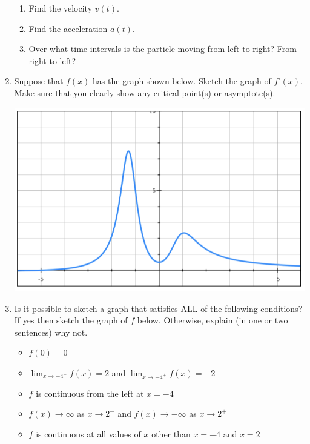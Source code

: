 \documentclass[letterpaper,12pt,fleqn]{article}
\begin{document}
\begin{enumerate}[left=0in]
  \begin{enumerate}
  \item Find the velocity \(v(t)\).

    \vspace{2in}
    
  \item Find the acceleration \(a(t)\).

    \vspace{2in}
    
  \item Over what time intervals is the particle moving from left to right? From right to left?
  \end{enumerate}

  \newpage

\item Suppose that \(f(x)\) has the graph shown below.  Sketch the graph of \(f'(x)\).  Make sure that you clearly
  show any critical point(s) or asymptote(s).

  \begin{center}
    \includegraphics{graph1}
  \end{center}

  \newpage

\item Is it possible to sketch a graph that satisfies ALL of the following conditions?  If yes then sketch the graph of
  \(f\) below.  Otherwise, explain (in one or two sentences) why not.
  \begin{itemize}
  \item \(f(0)=0\)
  \item \(\displaystyle\lim_{x\to-4^-}f(x)=2\) and \(\displaystyle\lim_{x\to-4^+}f(x)=-2\)
  \item \(f\) is continuous from the left at \(x=-4\)
  \item \(f(x)\to\infty\) as \(x\to2^-\) and \(f(x)\to-\infty\) as \(x\to2^+\)
  \item \(f\) is continuous at all values of \(x\) other than \(x=-4\) and \(x=2\)
  \end{itemize}


\end{enumerate}
\end{document}
